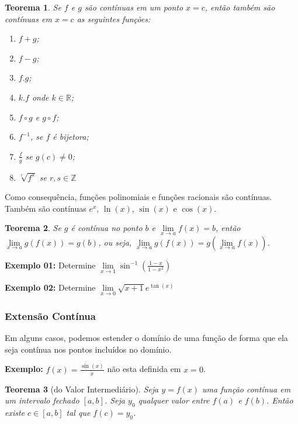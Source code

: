 \documentclass[oneside,a4paper,12pt]{article}
\newtheorem{theorem}{Teorema}[section]
\begin{document}
\begin{theorem}
	Se $f$ e $g$ são contínuas em um ponto $x=c$, então também são contínuas em $x=c$ as seguintes funções:
	\begin{enumerate}
		\item $f+g$;
		\item $f-g$;
		\item $f.g$;
		\item $k.f$ onde $k \in \mathbb{R}$;
		\item $f \circ g$ e $g \circ f$;
		\item $f^{-1}$, se $f$ é bijetora;
		\item $\frac{f}{g}$ se $g(c) \neq 0$;
		\item $\sqrt[r]{f^{s}}$ se $r,s \in \mathbb{Z}$
	\end{enumerate}
\end{theorem}
Como consequência, funções polinomiais e funções racionais são contínuas. Também são contínuas $e^x$, $\ln(x)$, $\sin(x)$ e $\cos(x)$.

\begin{theorem}
	Se $g$ é contínua no ponto $b$ e $\lim\limits_{x \rightarrow a}f(x) = b$, então $\lim\limits_{x \rightarrow a}g(f(x)) = g(b)$, ou seja, $\lim\limits_{x \rightarrow a}g(f(x)) = g(\lim\limits_{x \rightarrow a}f(x))$.
\end{theorem}

{\bf Exemplo 01: }Determine $\lim\limits_{x \rightarrow 1}\sin^{-1}\left(\frac{1-x}{1-x^2}\right)$

\vspace{200pt}

{\bf Exemplo 02: }Determine $\lim\limits_{x \rightarrow 0}\sqrt{x+1}e^{\tan(x)}$

\vspace{200pt}

\subsubsection{Extensão Contínua}

Em alguns casos, podemos estender o domínio de uma função de forma que ela seja contínua nos pontos incluídos no domínio.

{\bf Exemplo: } $f(x) = \frac{\sin(x)}{x}$ não esta definida em $x=0$.

\vspace{200pt}

\begin{theorem}[do Valor Intermediário]
	Seja $y = f(x)$ uma função contínua em um intervalo fechado $[a,b]$. Seja $y_0$ qualquer valor entre $f(a)$ e $f(b)$. Então existe $c \in [a,b]$ tal que $f(c) = y_0$.
\end{theorem}
\end{document}
